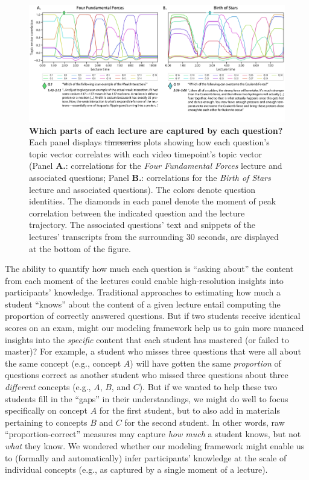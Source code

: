 \documentclass[10pt]{article}
\providecommand{\DIFaddtex}[1]{{\protect\color{blue}\uwave{#1}}} %
\providecommand{\DIFdeltex}[1]{{\protect\color{red}\sout{#1}}}                      %
\providecommand{\DIFaddFL}[1]{\DIFadd{#1}} %
\providecommand{\DIFdelFL}[1]{\DIFdel{#1}} %
\providecommand{\DIFaddbeginFL}{} %
\providecommand{\DIFaddendFL}{} %
\providecommand{\DIFdelbeginFL}{} %
\providecommand{\DIFdelendFL}{} %
\providecommand{\DIFadd}[1]{\texorpdfstring{\DIFaddtex{#1}}{#1}} %
\providecommand{\DIFdel}[1]{\texorpdfstring{\DIFdeltex{#1}}{}} %
\newcommand{\DIFscaledelfig}{0.5}
\newlength{\DIFdelgraphicswidth} %
\newlength{\DIFdelgraphicsheight} %
\newcommand{\DIFaddincludegraphics}[2][]{{\color{blue}\fbox{\DIFOincludegraphics[#1]{#2}}}} %
\newcommand{\DIFdelincludegraphics}[2][]{%
\sbox{\DIFdelgraphicsbox}{\DIFOincludegraphics[#1]{#2}}%
\settoboxwidth{\DIFdelgraphicswidth}{\DIFdelgraphicsbox} %
\settoboxtotalheight{\DIFdelgraphicsheight}{\DIFdelgraphicsbox} %
\scalebox{\DIFscaledelfig}{%
\parbox[b]{\DIFdelgraphicswidth}{\usebox{\DIFdelgraphicsbox}\\[-\baselineskip] \rule{\DIFdelgraphicswidth}{0em}}\llap{\resizebox{\DIFdelgraphicswidth}{\DIFdelgraphicsheight}{%
\setlength{\unitlength}{\DIFdelgraphicswidth}%
\begin{picture}(1,1)%
\thicklines\linethickness{2pt} %
{\color[rgb]{1,0,0}\put(0,0){\framebox(1,1){}}}%
{\color[rgb]{1,0,0}\put(0,0){\line( 1,1){1}}}%
{\color[rgb]{1,0,0}\put(0,1){\line(1,-1){1}}}%
\end{picture}%
}\hspace*{3pt}}} %
} %
\DeclareRobustCommand{\DIFaddbeginFL}{\DIFOaddbeginFL \let\includegraphics\DIFaddincludegraphics} %
\DeclareRobustCommand{\DIFaddendFL}{\DIFOaddendFL \let\includegraphics\DIFOincludegraphics} %
\DeclareRobustCommand{\DIFdelbeginFL}{\DIFOdelbeginFL \let\includegraphics\DIFdelincludegraphics} %
\DeclareRobustCommand{\DIFdelendFL}{\DIFOaddendFL \let\includegraphics\DIFOincludegraphics} %
\begin{document}
\begin{figure}[t]
    \centering
    \includegraphics[width=\textwidth]{figs/lecture-question-similarity}

    \caption{\textbf{Which parts of each lecture are captured by each
    question?} Each panel displays \DIFdelbeginFL \DIFdelFL{timeseries }\DIFdelendFL \DIFaddbeginFL \DIFaddFL{time series }\DIFaddendFL plots showing how each question's
    topic vector correlates with each video timepoint's topic vector (Panel
    \textbf{A.}: correlations for the \textit{Four Fundamental Forces} lecture
    and associated questions; Panel \textbf{B.}: correlations for the
    \textit{Birth of Stars} lecture and associated questions). The colors
    denote question identities. The diamonds in each panel denote the moment of
    peak correlation between the indicated question and the lecture trajectory.
    The associated questions' text and snippets of the lectures' transcripts
    from the surrounding 30 seconds, are displayed at the bottom of the
    figure.}

    \label{fig:question-correlations}
\end{figure}

The ability to quantify how much each question is ``asking about'' the content
from each moment of the lectures could enable high-resolution insights into
participants' knowledge. Traditional approaches to estimating how much a
student ``knows'' about the content of a given lecture entail computing the
proportion of correctly answered questions. But if two students receive
identical scores on an exam, might our modeling framework help us to gain more
nuanced insights into the \textit{specific} content that each student has
mastered (or failed to master)? For example, a student who misses three
questions that were all about the same concept (e.g., concept $A$) will have
gotten the same \textit{proportion} of questions correct as another student who
missed three questions about three \textit{different} concepts (e.g., $A$, $B$,
and $C$). But if we wanted to help these two students fill in the ``gaps'' in
their understandings, we might do well to focus specifically on concept $A$ for
the first student, but to also add in materials pertaining to concepts $B$ and
$C$ for the second student. In other words, raw ``proportion-correct'' measures
may capture \textit{how much} a student knows, but not \textit{what} they know.
We wondered whether our modeling framework might enable us to (formally and
automatically) infer participants' knowledge at the scale of individual
concepts (e.g., as captured by a single moment of a lecture).
\end{document}
